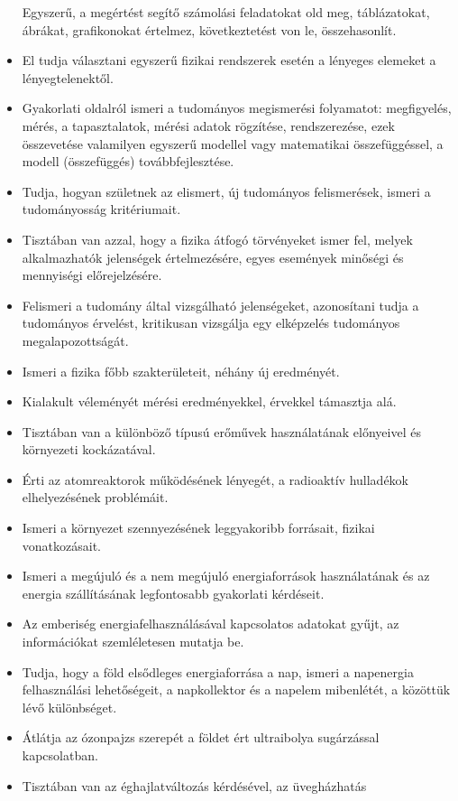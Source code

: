 \begin{itemize}
  Egyszerű, a megértést segítő számolási feladatokat old meg,
  táblázatokat, ábrákat, grafikonokat értelmez, következtetést von le,
  összehasonlít.
\item
  El tudja választani egyszerű fizikai rendszerek esetén a lényeges
  elemeket a lényegtelenektől.
\item
  Gyakorlati oldalról ismeri a tudományos megismerési folyamatot:
  megfigyelés, mérés, a tapasztalatok, mérési adatok rögzítése,
  rendszerezése, ezek összevetése valamilyen egyszerű modellel vagy
  matematikai összefüggéssel, a modell (összefüggés) továbbfejlesztése.
\item
  Tudja, hogyan születnek az elismert, új tudományos felismerések,
  ismeri a tudományosság kritériumait.
\item
  Tisztában van azzal, hogy a fizika átfogó törvényeket ismer fel,
  melyek alkalmazhatók jelenségek értelmezésére, egyes események
  minőségi és mennyiségi előrejelzésére.
\item
  Felismeri a tudomány által vizsgálható jelenségeket, azonosítani tudja
  a tudományos érvelést, kritikusan vizsgálja egy elképzelés tudományos
  megalapozottságát.
\item
  Ismeri a fizika főbb szakterületeit, néhány új eredményét.
\item
  Kialakult véleményét mérési eredményekkel, érvekkel támasztja alá.
\item
  Tisztában van a különböző típusú erőművek használatának előnyeivel és
  környezeti kockázatával.
\item
  Érti az atomreaktorok működésének lényegét, a radioaktív hulladékok
  elhelyezésének problémáit.
\item
  Ismeri a környezet szennyezésének leggyakoribb forrásait, fizikai
  vonatkozásait.
\item
  Ismeri a megújuló és a nem megújuló energiaforrások használatának és
  az energia szállításának legfontosabb gyakorlati kérdéseit.
\item
  Az emberiség energiafelhasználásával kapcsolatos adatokat gyűjt, az
  információkat szemléletesen mutatja be.
\item
  Tudja, hogy a föld elsődleges energiaforrása a nap, ismeri a
  napenergia felhasználási lehetőségeit, a napkollektor és a napelem
  mibenlétét, a közöttük lévő különbséget.
\item
  Átlátja az ózonpajzs szerepét a földet ért ultraibolya sugárzással
  kapcsolatban.
\item
  Tisztában van az éghajlatváltozás kérdésével, az üvegházhatás

\end{itemize}
